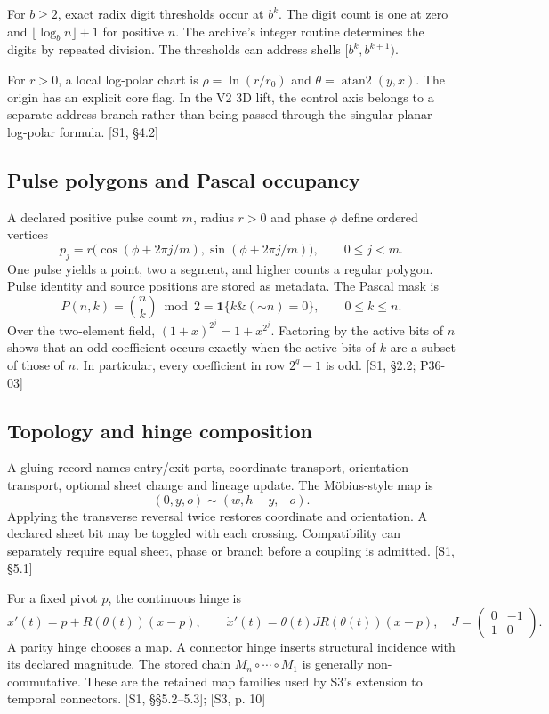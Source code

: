 \documentclass[11pt,a4paper]{article}
\numberwithin{equation}{section}
\newcommand{\src}[2]{{\sffamily\small\color{slate}[#1, #2]}}
\newcommand{\ind}{\mathbf 1}
\begin{document}
For $b\ge2$, exact radix digit thresholds occur at $b^k$. The digit count is one at zero and $\lfloor\log_b n\rfloor+1$ for positive $n$. The archive's integer routine determines the digits by repeated division. The thresholds can address shells $[b^k,b^{k+1})$.

For $r>0$, a local log-polar chart is $\rho=\ln(r/r_0)$ and $\theta=\operatorname{atan2}(y,x)$. The origin has an explicit core flag. In the V2 3D lift, the control axis belongs to a separate address branch rather than being passed through the singular planar log-polar formula. \src{S1}{\S4.2}

\subsection{Pulse polygons and Pascal occupancy}
A declared positive pulse count $m$, radius $r>0$ and phase $\phi$ define ordered vertices
\begin{equation}
p_j=r\big(\cos(\phi+2\pi j/m),\sin(\phi+2\pi j/m)\big),
\qquad0\le j<m.
\end{equation}
One pulse yields a point, two a segment, and higher counts a regular polygon. Pulse identity and source positions are stored as metadata. The Pascal mask is
\begin{equation}
P(n,k)=\binom nk\bmod2
=\ind\{k\mathbin{\&}(\mathord{\sim}n)=0\},\qquad0\le k\le n.
\end{equation}
Over the two-element field, $(1+x)^{2^j}=1+x^{2^j}$. Factoring by the active bits of $n$ shows that an odd coefficient occurs exactly when the active bits of $k$ are a subset of those of $n$. In particular, every coefficient in row $2^q-1$ is odd. \src{S1}{\S2.2; P36-03}

\subsection{Topology and hinge composition}
A gluing record names entry/exit ports, coordinate transport, orientation transport, optional sheet change and lineage update. The M\"obius-style map is
\begin{equation}
(0,y,o)\sim(w,h-y,-o).
\end{equation}
Applying the transverse reversal twice restores coordinate and orientation. A declared sheet bit may be toggled with each crossing. Compatibility can separately require equal sheet, phase or branch before a coupling is admitted. \src{S1}{\S5.1}

For a fixed pivot $p$, the continuous hinge is
\begin{equation}
x'(t)=p+R(\theta(t))(x-p),\qquad
\dot x'(t)=\dot\theta(t)JR(\theta(t))(x-p),
\quad J=\begin{pmatrix}0&-1\\1&0\end{pmatrix}.
\end{equation}
A parity hinge chooses a map. A connector hinge inserts structural incidence with its declared magnitude. The stored chain $M_n\circ\cdots\circ M_1$ is generally non-commutative. These are the retained map families used by S3's extension to temporal connectors. \src{S1}{§§5.2--5.3}; \src{S3}{p. 10}
\end{document}
